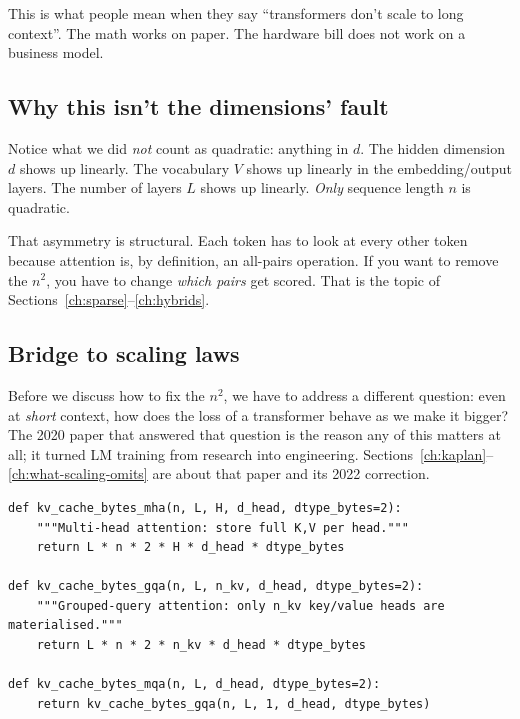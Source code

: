 This is what people mean when they say ``transformers don't scale to long
context''. The math works on paper. The hardware bill does not work on a
business model.


\subsection{Why this isn't the dimensions' fault}

Notice what we did \emph{not} count as quadratic: anything in \(d\). The
hidden dimension \(d\) shows up linearly. The vocabulary \(V\) shows up
linearly in the embedding/output layers. The number of layers \(L\) shows
up linearly. \emph{Only} sequence length \(n\) is quadratic.

That asymmetry is structural. Each token has to look at every other token
because attention is, by definition, an all-pairs operation. If you want to
remove the \(n^2\), you have to change \emph{which pairs} get scored. That
is the topic of Sections~\ref{ch:sparse}--\ref{ch:hybrids}.

\subsection{Bridge to scaling laws}

Before we discuss how to fix the \(n^2\), we have to address a different
question: even at \emph{short} context, how does the loss of a transformer
behave as we make it bigger? The 2020 paper that answered that question
\citep{kaplan2020scaling} is the reason any of this matters at all; it
turned LM training from research into engineering. Sections~\ref{ch:kaplan}--\ref{ch:what-scaling-omits} are about that
paper and its 2022 correction.

\begin{lstlisting}[caption={KV-cache footprint (\textsc{fp16}); multiply by batch size if distinct sequences each carry their own cache.}]
def kv_cache_bytes_mha(n, L, H, d_head, dtype_bytes=2):
    """Multi-head attention: store full K,V per head."""
    return L * n * 2 * H * d_head * dtype_bytes

def kv_cache_bytes_gqa(n, L, n_kv, d_head, dtype_bytes=2):
    """Grouped-query attention: only n_kv key/value heads are materialised."""
    return L * n * 2 * n_kv * d_head * dtype_bytes

def kv_cache_bytes_mqa(n, L, d_head, dtype_bytes=2):
    return kv_cache_bytes_gqa(n, L, 1, d_head, dtype_bytes)
\end{lstlisting}

